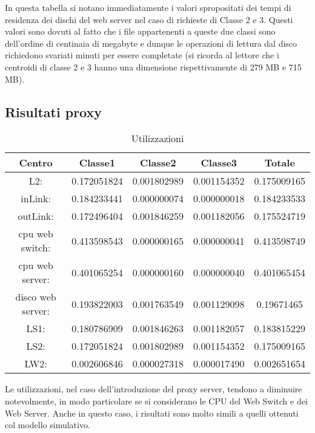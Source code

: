 In questa tabella si notano immediatamente i valori spropositati dei tempi di residenza dei dischi del web server nel caso di richieste di Classe 2 e 3. Questi valori sono dovuti al fatto che i file appartenenti a queste due classi sono dell'ordine di centinaia di megabyte e dunque le operazioni di lettura dal disco richiedono svariati minuti per essere completate (si ricorda al lettore che i centroidi di classe 2 e 3 hanno una dimensione rispettivamente di 279 MB e 715 MB).

\subsection{Risultati proxy}
\begin{table}[htbp]
\begin{center}
\begin{tabular}{|c|c|c|c|c|}
\hline
Centro &Classe1 &Classe2 &Classe3 &Totale\\
\hline
\hline
L2: &0.172051824 &0.001802989 &0.001154352 &0.175009165\\
\hline
inLink: &0.184233441 &0.000000074 &0.000000018 &0.184233533\\
\hline
outLink: &0.172496404 &0.001846259 &0.001182056 &0.175524719\\
\hline
cpu web switch: &0.413598543 &0.000000165 &0.000000041 &0.413598749\\
\hline
cpu web server: &0.401065254 &0.000000160 &0.000000040 &0.401065454\\
\hline
disco web server: &0.193822003 &0.001763549 &0.001129098 &0.19671465\\
\hline
LS1: &0.180786909 &0.001846263 &0.001182057 &0.183815229\\
\hline
LS2: &0.172051824 &0.001802989 &0.001154352 &0.175009165\\
\hline
LW2: &0.002606846 &0.000027318 &0.000017490 &0.002651654\\
\hline
\end{tabular}
\end{center}
\caption{Utilizzazioni}
\label{utilizzazioni}
\end{table}
Le utilizzazioni, nel caso dell'introduzione del proxy server, tendono a diminuire notevolmente, in modo particolare se si considerano le CPU del Web Switch e dei Web Server. Anche in questo caso, i risultati sono molto simili a quelli ottenuti col modello simulativo.
